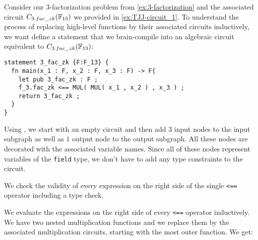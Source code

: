 \begin{example}[$3$-factorization] Consider our $3$-factorization problem from \examplename{} \ref{ex:3-factorization} and the associated circuit $C_{3.fac\_zk}(\mathbb{F}_{13})$ we provided in \examplename{} \ref{ex:TJJ-circuit_1}. To understand the process of replacing high-level functions by their associated circuits inductively, we want define a  statement that we brain-compile into an algebraic circuit equivalent to $C_{3.fac\_zk}(\mathbb{F}_{13})$:
\begin{lstlisting}
statement 3_fac_zk {F:F_13} {
  fn main(x_1 : F, x_2 : F, x_3 : F) -> F{
	let pub 3_fac_zk : F ;
    f_3.fac_zk <== MUL( MUL( x_1 , x_2 ) , x_3 ) ;
    return 3_fac_zk ;
  }
}
\end{lstlisting} 
Using , we start with an empty circuit and then add $3$ input nodes to the input subgraph as well as $1$ output node to the output subgraph. All these nodes are decorated with the associated variable names. Since all of these nodes represent variables of the \texttt{field} type, we don't have to add any type constraints to the circuit.

We check the validity of every expression on the right side of the single \texttt{<==} operator including a type check. 

We evaluate the expressions on the right side of every \texttt{<==} operator inductively. We have two nested multiplication functions and we replace them by the associated multiplication circuits, starting with the most outer function. We get: 
\begin{center}
\end{center}
\end{example}
